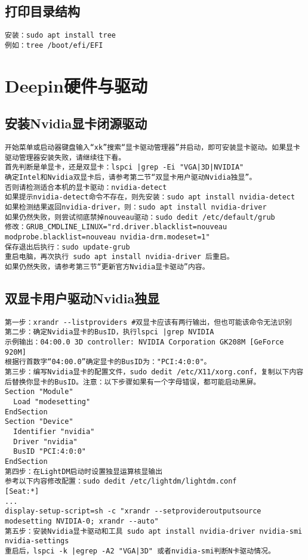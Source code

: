 \documentclass[a4paper,fontset=fandol,zihao=-4,linespread=1.2,oneside]{ctexbook}
\begin{document}
\section{打印目录结构}
\begin{lstlisting}
安装：sudo apt install tree
例如：tree /boot/efi/EFI
\end{lstlisting}


\chapter{Deepin硬件与驱动}

\section{安装Nvidia显卡闭源驱动}
\begin{lstlisting}
开始菜单或启动器键盘输入“xk”搜索“显卡驱动管理器”并启动，即可安装显卡驱动。如果显卡驱动管理器安装失败，请继续往下看。
首先判断是单显卡，还是双显卡：lspci |grep -Ei "VGA|3D|NVIDIA"
确定Intel和Nvidia双显卡后，请参考第二节“双显卡用户驱动Nvidia独显”。
否则请检测适合本机的显卡驱动：nvidia-detect
如果提示nvidia-detect命令不存在，则先安装：sudo apt install nvidia-detect
如果检测结果返回nvidia-driver，则：sudo apt install nvidia-driver
如果仍然失败，则尝试彻底禁掉nouveau驱动：sudo dedit /etc/default/grub
修改：GRUB_CMDLINE_LINUX="rd.driver.blacklist=nouveau modprobe.blacklist=nouveau nvidia-drm.modeset=1"
保存退出后执行：sudo update-grub
重启电脑，再次执行 sudo apt install nvidia-driver 后重启。
如果仍然失败，请参考第三节“更新官方Nvidia显卡驱动”内容。
\end{lstlisting}

\section{双显卡用户驱动Nvidia独显}
\begin{lstlisting}
第一步：xrandr --listproviders #双显卡应该有两行输出，但也可能该命令无法识别
第二步：确定Nvidia显卡的BusID，执行lspci |grep NVIDIA
示例输出：04:00.0 3D controller: NVIDIA Corporation GK208M [GeForce 920M]
根据行首数字“04:00.0”确定显卡的BusID为："PCI:4:0:0"。
第三步：编写Nvidia显卡的配置文件，sudo dedit /etc/X11/xorg.conf，复制以下内容后替换你显卡的BusID。注意：以下步骤如果有一个字母错误，都可能启动黑屏。
Section "Module"
  Load "modesetting"
EndSection
Section "Device"
  Identifier "nvidia"
  Driver "nvidia"
  BusID "PCI:4:0:0"
EndSection
第四步：在LightDM启动时设置独显运算核显输出
参考以下内容修改配置：sudo dedit /etc/lightdm/lightdm.conf
[Seat:*]
...
display-setup-script=sh -c "xrandr --setprovideroutputsource modesetting NVIDIA-0; xrandr --auto"
第五步：安装Nvidia显卡驱动和工具 sudo apt install nvidia-driver nvidia-smi nvidia-settings
重启后，lspci -k |egrep -A2 "VGA|3D" 或者nvidia-smi判断N卡驱动情况。
\end{lstlisting}
\end{document}
